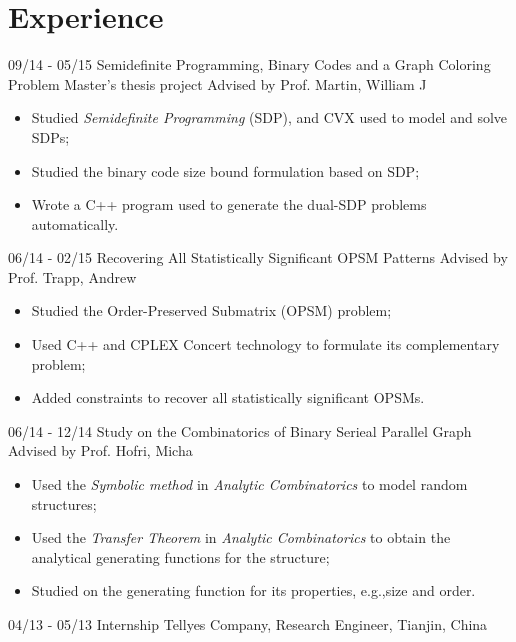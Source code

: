 \documentclass[]{friggeri-cv}
\begin{document}
\section{Experience}
\begin{entrylist}
	\entry
	{09/14 - 05/15}
	{Semidefinite Programming, Binary Codes and a Graph Coloring Problem}
	{Master's thesis project Advised by Prof. Martin, William J}
	{
		\vspace{-3mm}
		\begin{itemize}
			\item Studied {\em Semidefinite Programming} (SDP), and CVX used to model
				and solve SDPs;
			\item Studied the binary code size bound formulation based on SDP;
			\item Wrote a C++ program used to generate the dual-SDP problems
				automatically.\\
		\end{itemize}
	}
	\entry
	{06/14 - 02/15}
	{Recovering All Statistically Significant OPSM Patterns}
	{Advised by Prof. Trapp, Andrew}
	{
		\vspace{-3mm}
		\begin{itemize}
			\item Studied the Order-Preserved Submatrix (OPSM) problem;
			\item Used C++ and CPLEX Concert technology to formulate its complementary problem;
			\item Added constraints to recover all statistically significant OPSMs.\\
		\end{itemize}
	}
	\entry
	{06/14 - 12/14}
	{Study on the Combinatorics of Binary Serieal Parallel Graph}
	{Advised by Prof. Hofri, Micha}
	{
		\vspace{-3mm}
		\begin{itemize}
			\item Used the \emph{Symbolic method} in {\em Analytic Combinatorics} to
				model random structures;
			\item Used the \emph{Transfer Theorem} in {\em Analytic Combinatorics} to
				obtain the analytical generating functions for the structure;
			\item Studied on the generating function for its properties, e.g.,size and
				order.\\
		\end{itemize}
	}
	\entry
	{04/13 - 05/13}
	{Internship}
	{Tellyes Company, Research Engineer, Tianjin, China}
	{
		\vspace{-3mm}
}
\end{entrylist}
\end{document}
